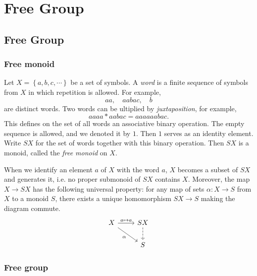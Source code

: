 \chapter{Free Group}

\section{Free Group}

\subsection{Free monoid}

\begin{definition}
  Let \( X = \left\lbrace a, b, c, \cdots \right\rbrace \) be a set of symbols.
  A \emph{word} is a finite sequence of symbols from \( X \) in which repetition
  is allowed. For example,
  \[
    aa,\quad aabac,\quad b
  \]
  are distinct words.
  Two words can be ultiplied by \emph{juxtaposition}, for example,
  \[
    aaaa * aabac = aaaaaabac.
  \]
  This defines on the set of all words an associative binary operation.
  The empty sequence is allowed, and we denoted it by \( 1 \).
  Then \( 1 \) serves as an identity element.
  Write \( SX \) for the set of words together with this binary operation.
  Then \( SX \) is a monoid, called the \emph{free monoid} on \( X \).
\end{definition}

\begin{proposition}
  When we identify an element \( a \) of \( X \) with the word \( a \), \( X \)
  becomes a subset of \( SX \) and generates it, i.e. no proper submonoid of \(
  SX \) contains \( X \). Moreover, the map \( X \to SX \) has the following
  universal property: for any map of sets \( \alpha: X \to S \) from \( X \) to
  a monoid \( S \), there exists a unique homomorphism \( SX \to S \) making the
  diagram commute.
  \[\begin{tikzcd}
    X & SX \\
    & S
    \arrow["{a \mapsto a}", from=1-1, to=1-2]
    \arrow["\alpha"', from=1-1, to=2-2]
    \arrow[dashed, from=1-2, to=2-2]
  \end{tikzcd}\]
\end{proposition}

\subsection{Free group}

